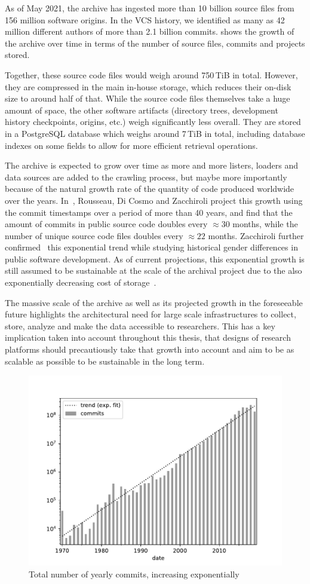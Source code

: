 As of May 2021, the archive has ingested more than 10 billion source files from
156 million software origins. In the \gls{VCS} history, we identified as many
as 42 million different authors of more than 2.1 billion commits.
 shows the growth of the archive over time in terms of the
number of source files, commits and projects stored.

Together, these source code files would weigh around 750\,TiB in total.
However, they are compressed in the main in-house storage, which reduces their
on-disk size to around half of that. While the
source code files themselves take a huge amount of space, the other software
artifacts (directory trees, development history checkpoints, origins, etc.)
weigh significantly less overall. They are stored in a PostgreSQL database
which weighs around 7\,TiB in total, including database indexes on some fields
to allow for more efficient retrieval operations.

The archive is expected to grow over time as more and more listers,
loaders and data sources are added to the crawling process, but maybe more
importantly because of the natural growth rate of the quantity of code produced
worldwide over the years. In~\cite{swh-provenance-emse}, Rousseau, Di Cosmo and
Zacchiroli project this growth using the commit timestamps over a period of
more than 40 years, and find that the amount of commits in public source code
doubles every $\approx 30$ months, while the number of unique source code files
doubles every $\approx 22$ months. Zacchiroli further
confirmed~\cite{ieee-sw-gender-swh} this exponential trend while studying
historical gender differences in public software development. As of current
projections, this exponential growth is still assumed to be sustainable at the
scale of the archival project due to the also exponentially decreasing cost of
storage~\cite{swh-provenance-emse}.

The massive scale of the archive as well as its projected growth in the
foreseeable future highlights the architectural need for large scale
infrastructures to collect, store, analyze and make the data accessible to
researchers. This has a key implication taken into account throughout this
thesis, that designs of research platforms should precautiously take that
growth into account and aim to be as scalable as possible to be sustainable in
the long term.

\begin{figure}
    \centering
    \includegraphics[width=0.5\linewidth]{../img/commit-growth}
    \caption{Total number of yearly commits, increasing
    exponentially~\cite{ieee-sw-gender-swh}}%
    \label{fig:swh-commit-growth}
\end{figure}
